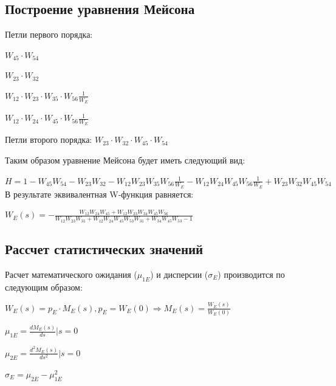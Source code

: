 \documentclass[14pt,a4paper,report]{report}
\begin{document}
\subsection{Построение уравнения Мейсона}

Петли первого порядка:

$W_{45}\cdot W_{54}$

$W_{23}\cdot W_{32}$

$W_{12}\cdot W_{23}\cdot W_{35}\cdot W_{56}\frac{1}{W_E}$

$W_{12}\cdot W_{24}\cdot W_{45}\cdot W_{56}\frac{1}{W_E}$

Петли второго порядка:
$W_{23}\cdot W_{32}\cdot W_{45}\cdot W_{54}$

Таким образом уравнение Мейсона будет иметь следующий вид:

$H=1 - W_{45}W_{54}-W_{23}W_{32}-W_{12}W_{23}W_{35}W_{56}\frac{1}{W_E}-W_{12}W_{24}W_{45}W_{56}\frac{1}{W_E}+W_{23}W_{32}W_{45}W_{54}$\\

В результате эквивалентная W-функция равняется:

$W_E(s)=- \frac{W_{12}W_{24}W_{45} + W_{12}W_{23}W_{34}W_{45}W_{56}}{W_{12}W_{23}W_{31} +W_{12}W_{24}W_{45}W_{53}W_{31}+W_{34}W_{45}W_{53} -1}$\\

\subsection{Рассчет статистических значений}

Расчет математического ожидания ($\mu_{1E}$) и дисперсии ($\sigma_E$) производится по следующим образом:

$W_E(s)=p_E\cdot M_E(s), p_E=W_E(0)\Longrightarrow M_E(s)=\frac{W_E(s)}{W_E(0)}$

$\mu_{1E}=\frac{d M_E(s)}{ds}|s=0$

$\mu_{2E}=\frac{d^2 M_E(s)}{ds^2}|s=0$

$\sigma_E=\mu_{2E}-\mu_{1E}^2$\\
\end{document}

